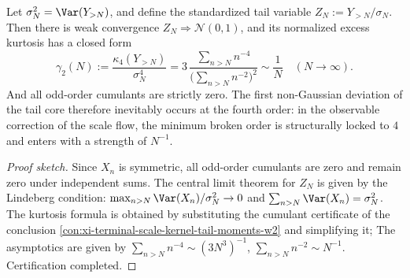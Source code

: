 \begin{conclusion}[Gaussianization and fourth-order head breaking of the tail kernel: non-Gaussianity is uniquely dominated by \texorpdfstring{$q=4$}{q=4} magnitude]\label{con:xi-terminal-scale-kernel-tail-gaussianization-kurtosis}
Let \(\sigma_N^2=\Var(Y_{>N})\), and define the standardized tail variable \(Z_N:=Y_{>N}/\sigma_N\).
Then there is weak convergence \(Z_N\Rightarrow \mathcal N(0,1)\), and its normalized excess kurtosis has a closed form
\[
\boxed{\;
\gamma_2(N):=\frac{\kappa_4(Y_{>N})}{\sigma_N^4}
=3\,\frac{\sum_{n>N}n^{-4}}{\bigl(\sum_{n>N}n^{-2}\bigr)^2}
\sim \frac{1}{N}\quad(N\to\infty).\;}
\]
And all odd-order cumulants are strictly zero.
The first non-Gaussian deviation of the tail core therefore inevitably occurs at the fourth order: in the observable correction of the scale flow, the minimum broken order is structurally locked to \(4\) and enters with a strength of \(N^{-1}\).
\end{conclusion}
\begin{proof}[Proof sketch]
Since \(X_n\) is symmetric, all odd-order cumulants are zero and remain zero under independent sums.
The central limit theorem for \(Z_N\) is given by the Lindeberg condition: \(\max_{n>N}\Var(X_n)/\sigma_N^2\to 0\) and \(\sum_{n>N}\Var(X_n)=\sigma_N^2\).
The kurtosis formula is obtained by substituting the cumulant certificate of the conclusion \ref{con:xi-terminal-scale-kernel-tail-moments-w2} and simplifying it;
The asymptotics are given by \(\sum_{n>N}n^{-4}\sim (3N^3)^{-1}\), \(\sum_{n>N}n^{-2}\sim N^{-1}\). Certification completed.
\end{proof}


